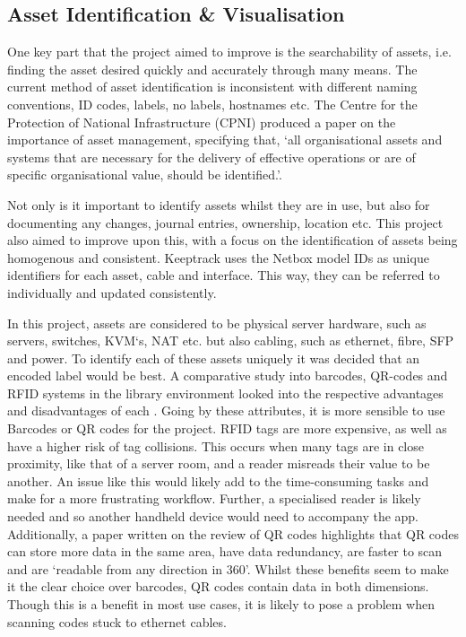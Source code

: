 \documentclass [11pt,a4paper]{article}
\begin{document}
\subsection{Asset Identification \& Visualisation}
\label{sec:technical}

One key part that the project aimed to improve is the searchability of assets, i.e. finding the asset desired quickly and accurately through many means. The current method of asset identification is inconsistent with different naming conventions, ID codes, labels, no labels, hostnames etc. The Centre for the Protection of National Infrastructure (CPNI) produced a paper on the importance of asset management, specifying that, `all organisational assets and systems that are necessary for the delivery of effective operations or are of specific organisational value, should be identified.'\cite{cpni}.

Not only is it important to identify assets whilst they are in use, but also for documenting any changes, journal entries, ownership, location etc. This project also aimed to improve upon this, with a focus on the identification of assets being homogenous and consistent. Keeptrack uses the Netbox model IDs as unique identifiers for each asset, cable and interface. This way, they can be referred to individually and updated consistently. 

In this project, assets are considered to be physical server hardware, such as servers, switches, KVM`s, NAT etc. but also cabling, such as ethernet, fibre, SFP and power. To identify each of these assets uniquely it was decided that an encoded label would be best. A comparative study into barcodes, QR-codes and RFID systems in the library environment looked into the respective advantages and disadvantages of each \cite{lotlikar2013comparative}. Going by these attributes, it is more sensible to use Barcodes or QR codes for the project. RFID tags are more expensive, as well as have a higher risk of tag collisions. This occurs when many tags are in close proximity\cite{lotlikar2013comparative}, like that of a server room, and a reader misreads their value to be another. An issue like this would likely add to the time-consuming tasks and make for a more frustrating workflow. Further, a specialised reader is likely needed and so another handheld device would need to accompany the app. Additionally, a paper written on the review of QR codes highlights that QR codes can store more data in the same area, have data redundancy, are faster to scan and are `readable from any direction in 360\degree'\cite{mishra2017review}. Whilst these benefits seem to make it the clear choice over barcodes, QR codes contain data in both dimensions. Though this is a benefit in most use cases, it is likely to pose a problem when scanning codes stuck to ethernet cables.
\end{document}
